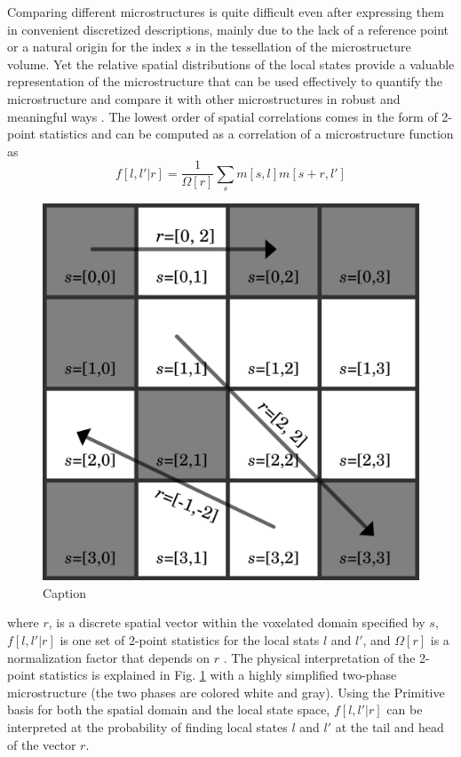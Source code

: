 \documentclass{bmcart}
\begin{document}
Comparing different microstructures is quite difficult even after expressing them in convenient discretized descriptions, mainly due to the lack of a reference point or a natural origin for the index $s$ in the tessellation of the microstructure volume. Yet the relative spatial distributions of the local states provide a valuable representation of the microstructure that can be used effectively to quantify the microstructure and compare it with other microstructures in  robust and meaningful ways \cite{niezgoda2011understanding, niezgoda2010optimized, niezgoda2013novel, cceccen2014data, cecen2016versatile}. The lowest order of spatial correlations comes in the form of 2-point statistics and can be computed as a correlation of a microstructure function as
\begin{equation}\label{eq:stats}
    f[l, l'| r] = \frac{1}{\Omega[ r]} \sum_{s} m[s, l] m[s +  r, l']
\end{equation}
\begin{figure}
    \centering
    \includegraphics{fig/stats_micro_example.png}
    \caption{Caption}
    \label{fig:stats}
\end{figure}
where $r$, is a discrete spatial vector within the voxelated domain specified by $s$, $f[l, l'|  r]$ is one set of 2-point statistics for the local stats $l$ and $l'$, and $\Omega[ r]$ is a normalization factor that depends on $ r$ \cite{cecen2016versatile}. The physical interpretation of the 2-point statistics is explained in Fig. \ref{fig:stats} with a highly simplified two-phase microstructure (the two phases are colored white and gray). Using the Primitive basis for both the spatial domain and the local state space, $f[l, l'|  r]$ can be interpreted at the probability of finding local states $l$ and $l'$ at the tail and head of the vector $ r$.
\end{document}
